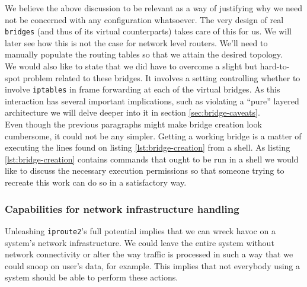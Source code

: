             We believe the above discussion to be relevant as a way of justifying why we need not be concerned with any configuration whatsoever. The very design of real \texttt{bridges} (and thus of its virtual counterparts) takes care of this for us. We will later see how this is not the case for network level routers. We'll need to manually populate the routing tables so that we attain the desired topology.\\

            We would also like to state that we did have to overcome a slight but hard-to-spot problem related to these bridges. It involves a setting controlling whether to involve \texttt{iptables} in frame forwarding at each of the virtual bridges. As this interaction has several important implications, such as violating a ``pure'' layered architecture we will delve deeper into it in section \ref{sec:bridge-caveats}.\\

            Even though the previous paragraphs might make bridge creation look cumbersome, it could not be any simpler. Getting a working bridge is a matter of executing the lines found on listing \ref{lst:bridge-creation} from a shell. As listing \ref{lst:bridge-creation} contains commands that ought to be run in a shell we would like to discuss the necessary execution permissions so that someone trying to recreate this work can do so in a satisfactory way.\\

            \subsubsection{Capabilities for network infrastructure handling}
                Unleashing \texttt{iproute2}'s full potential implies that we can wreck havoc on a system's network infrastructure. We could leave the entire system without network connectivity or alter the way traffic is processed in such a way that we could snoop on user's data, for example. This implies that not everybody using a system should be able to perform these actions.\\

